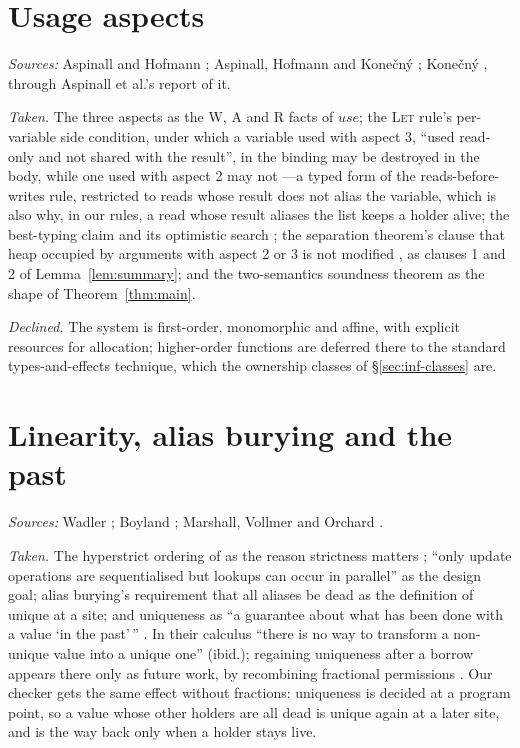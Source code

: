 \section{Usage aspects}

\emph{Sources:} Aspinall and Hofmann \citep{aspinall2002another}; Aspinall, Hofmann and
Kone\v{c}n\'y \citep{aspinall2008usage}; Kone\v{c}n\'y \citep{konecny2003typing}, through Aspinall et
al.'s report of it.

\emph{Taken.} The three aspects \citep[\S1]{aspinall2008usage} as the \textsf{W}, \textsf{A} and
\textsf{R} facts of $\mathit{use}$; the \textsc{Let} rule's per-variable side condition, under which a
variable used with aspect 3, ``used read-only and not shared with the result'', in the binding may be
destroyed in the body, while one used with aspect 2 may not \citep[Fig.~8]{aspinall2008usage}---a typed form of the reads-before-writes rule, restricted to reads whose result does not alias the
variable, which is also why, in our rules, a read whose result aliases the list keeps a holder alive; the
best-typing claim and its optimistic search \citep[\S6.2]{aspinall2008usage}; the
separation theorem's clause that heap occupied by arguments with aspect 2 or 3 is not modified
\citep[Thm.~5.4]{aspinall2008usage}, as clauses 1 and 2 of Lemma~\ref{lem:summary}; and the
two-semantics soundness theorem \citep[Thm.~5.8]{aspinall2008usage} as the shape of
Theorem~\ref{thm:main}.

\emph{Declined.} The system is first-order, monomorphic and affine, with explicit resources for
allocation; higher-order functions are deferred there to the standard types-and-effects technique,
which the ownership classes of \S\ref{sec:inf-classes} are.

\section{Linearity, alias burying and the past}

\emph{Sources:} Wadler \citep{wadler1990linear,wadler1991use}; Boyland \citep{boyland2001alias};
Marshall, Vollmer and Orchard \citep{marshall2022entente}.

\emph{Taken.} The hyperstrict ordering of  as the reason strictness matters
\citep{wadler1990linear}; ``only update operations are sequentialised but lookups can occur in
parallel'' \citep[\S3]{wadler1991use} as the design goal; alias burying's requirement that all aliases
be dead \citep[\S3.2]{boyland2001alias} as the definition of unique at a site; and uniqueness as ``a
guarantee about what has been done with a value `in the past'\,'' \citep[\S2.2]{marshall2022entente}. In
their calculus ``there is no way to transform a non-unique value into a unique one'' (ibid.); regaining
uniqueness after a borrow appears there only as future work, by recombining fractional permissions
\citep[\S6]{marshall2022entente}. Our checker gets the same effect without fractions: uniqueness is
decided at a program point, so a value whose other holders are all dead is unique again at a later site,
and  is the way back only when a holder stays live.


